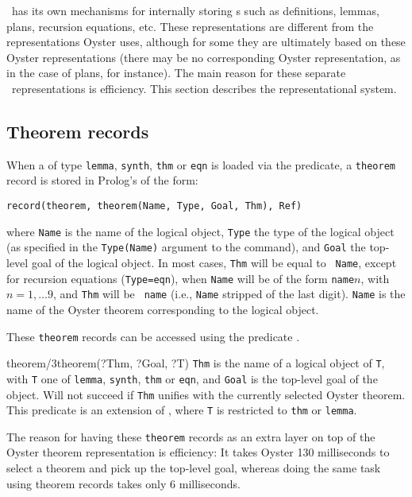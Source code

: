 \clam\ has its own mechanisms for internally storing s such as definitions, lemmas, plans, recursion equations,
etc. These representations are different from the representations
Oyster uses, although for some they are ultimately based on these
Oyster representations (there may be no corresponding Oyster
representation, as in the case of plans, for instance).  The main
reason for these separate \clam\ representations is efficiency. This
section describes the {\clam} representational system.

\subsection {Theorem records}
When a  of type {\tt lemma}, {\tt synth}, {\tt thm} or
{\tt eqn} is loaded via the  predicate, a
{\tt theorem} record is stored in Prolog's  of the
form: 
\begin{verbatim}
record(theorem, theorem(Name, Type, Goal, Thm), Ref)
\end{verbatim}
where {\tt Name} is the name of the logical object, {\tt Type} the type
of the logical object (as specified in the {\tt Type(Name)} argument
to the  command), and {\tt Goal} the top-level goal of
the logical object. In most cases, {\tt Thm} will be equal to {\tt
Name}, except for recursion equations ({\tt Type=eqn}), when {\tt Name}
will be of the form {\tt name}$n$, with $n=1,\ldots9$,
and {\tt Thm} will be {\tt
name} (i.e., {\tt Name} stripped of the last digit). {\tt Name} is the
name of the Oyster theorem corresponding to the logical object.

These
{\tt theorem} records can be accessed using the predicate .
\begin{predicate}{theorem/3}{theorem(?Thm, ?Goal, ?T)}%
{\tt Thm} is the name of a logical object of {\tt T}, with {\tt T} one
of {\tt lemma}, {\tt synth}, {\tt thm} or {\tt eqn}, and {\tt Goal} is
the top-level goal of the object. Will not succeed if {\tt Thm}
unifies with the currently selected Oyster theorem. This predicate is
an extension of , where {\tt T} is restricted to {\tt thm} or
{\tt lemma}.
\end{predicate}

The reason for having these {\tt theorem} records as an extra layer
on top of the Oyster theorem representation is efficiency: It takes 
Oyster 130 milliseconds to select a theorem and pick up the top-level
goal, whereas doing the same task using theorem records takes only 6
milliseconds. 

